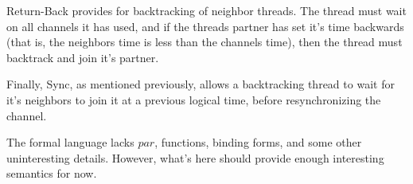 \documentclass[9pt]{article}
\begin{document}
  Return-Back provides for backtracking of neighbor threads. The thread
  must wait on all channels it has used, and if the threads partner has set
  it's time backwards (that is, the neighbors time is less than the
  channels time), then the thread must backtrack and join it's partner.

  Finally, Sync, as mentioned previously, allows a backtracking thread
  to wait for it's neighbors to join it at a previous logical time,
  before resynchronizing the channel.


  The formal language lacks $par$, functions, binding forms, and some
  other uninteresting details. However, what's here should provide
  enough interesting semantics for now.
\end{document}
